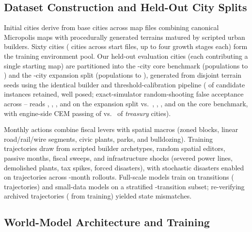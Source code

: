 \subsection{Dataset Construction and Held-Out City Splits}\label{app:data}

Initial cities derive from \FamiliesTotal{} base cities across \StartFiles{} map files combining canonical Micropolis maps with procedurally generated terrains matured by scripted urban builders. Sixty cities (\TrainFamilies{} cities across \TrainStarts{} start files, up to four growth stages each) form the training environment pool. Our \AllCities{} held-out evaluation cities (each contributing a single starting map) are partitioned into the \HeldOutFamilies-city core benchmark (populations \PopMin{} to \PopMax{}) and the \XCities-city expansion split (populations \XPopMin{} to \XPopMax{}), generated from disjoint terrain seeds using the identical builder and threshold-calibration pipeline (\XInstances{} of \XInstancesPlanned{} candidate instances retained, \XWellPosed{} well posed; exact-simulator random-shooting false acceptance across -- reads \ReplRandOneEightyPerfHack{}, \ReplRandTenEightyPerfHack{}, \ReplRandHundEightyPerfHack{}, and \ReplRandThouEightyPerfHack{} on the expansion split vs.\ \ReplRandOneFortyPerfHack{}, \ReplRandTenFortyPerfHack{}, \ReplRandHundFortyPerfHack{}, and \ReplRandThouFortyPerfHack{} on the core benchmark, with engine-side CEM passing \XTreasCemPass{} of \XTreasCount{} vs.\ \TreasCemPass{} of \TreasCount{} \emph{treasury} cities).

Monthly actions combine fiscal levers with spatial macros (zoned blocks, linear road/rail/wire segments, civic plants, parks, and bulldozing). Training trajectories draw from \BuilderStyles{} scripted builder archetypes, random spatial editors, passive months, fiscal sweeps, and infrastructure shocks (severed power lines, demolished plants, tax spikes, forced disasters), with stochastic disasters enabled on \DisasterTraj{} trajectories across \TrajHorizons{}-month rollouts. Full-scale models train on \TrainTransitions{} transitions (\TrainTrajectories{} trajectories) and small-data models on a stratified \SmallTransitions{}-transition subset; re-verifying \VerifyTrajectories{} archived trajectories (\VerifyTrain{} from training) yielded \VerifyMismatches{} state mismatches.

\subsection{World-Model Architecture and Training}\label{app:emulator}

